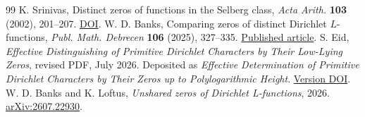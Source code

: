 \documentclass[11pt]{article}
\begin{document}
\begin{thebibliography}{99}
 K. Srinivas, Distinct zeros of functions in the Selberg class, \emph{Acta Arith.} \textbf{103} (2002), 201--207. \href{https://doi.org/10.4064/aa103-3-1}{DOI}.
 W. D. Banks, Comparing zeros of distinct Dirichlet \(L\)-functions, \emph{Publ. Math. Debrecen} \textbf{106} (2025), 327--335. \href{https://publi.math.unideb.hu/paper/4308}{Published article}.
 S. Eid, \emph{Effective Distinguishing of Primitive Dirichlet Characters by Their Low-Lying Zeros}, revised PDF, July 2026. Deposited as \emph{Effective Determination of Primitive Dirichlet Characters by Their Zeros up to Polylogarithmic Height}. \href{https://doi.org/10.5281/zenodo.21326653}{Version DOI}.
 W. D. Banks and K. Loftus, \emph{Unshared zeros of Dirichlet L-functions}, 2026. \href{https://arxiv.org/abs/2607.22930}{arXiv:2607.22930}.
\end{thebibliography}
\end{document}
